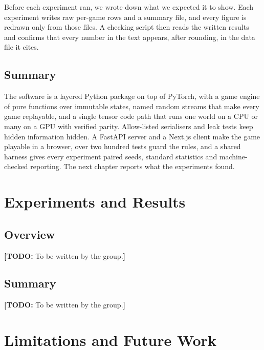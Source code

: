 \documentclass[11pt,a4paper,oneside]{report}
\newcommand{\todo}[1]{\textcolor{todo}{\textbf{[TODO:} #1\textbf{]}}}
\newcommand{\overviewsection}{\section{Overview}}
\newcommand{\summarysection}{\section{Summary}}
\begin{document}
Before each experiment ran, we wrote down what we expected it to show. Each experiment writes raw per-game
rows and a summary file, and every figure is redrawn only from those files. A checking script then reads
the written results and confirms that every number in the text appears, after rounding, in the data file it
cites.

\summarysection

The software is a layered Python package on top of PyTorch, with a game engine of pure functions over
immutable states, named random streams that make every game replayable, and a single tensor code path that
runs one world on a CPU or many on a GPU with verified parity. Allow-listed serialisers and leak tests keep
hidden information hidden. A FastAPI server and a Next.js client make the game playable in a browser, over
two hundred tests guard the rules, and a shared harness gives every experiment paired seeds, standard
statistics and machine-checked reporting. The next chapter reports what the experiments found.

\chapter{Experiments and Results}\label{ch:results}

\overviewsection

\todo{To be written by the group.}


\summarysection

\todo{To be written by the group.}

\chapter{Limitations and Future Work}\label{ch:limits}
\end{document}
